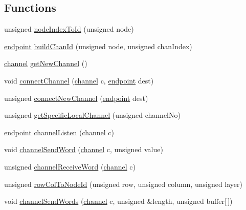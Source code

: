 \subsection*{Functions}
\begin{DoxyCompactItemize}
\item 
unsigned \hyperlink{_swallow-helpers_8h_a58f5683194e9d62e69b9d73ce1416055}{node\+Index\+To\+Id} (unsigned node)
\item 
\hyperlink{_swallow-helpers_8h_ab1358ba323e68c233f100abc11bdc7ea}{endpoint} \hyperlink{_swallow-helpers_8h_a096630d81be63da93af11a77c35163e8}{build\+Chan\+Id} (unsigned node, unsigned chan\+Index)
\item 
\hyperlink{_swallow-helpers_8h_aa6ea79b51cb1a11714e12ddd689dd15c}{channel} \hyperlink{_swallow-helpers_8h_ae766ff2b68dabf370997e2005ce2dc4d}{get\+New\+Channel} ()
\item 
void \hyperlink{_swallow-helpers_8h_a4fc6da8d25bce838539832b011089fb2}{connect\+Channel} (\hyperlink{_swallow-helpers_8h_aa6ea79b51cb1a11714e12ddd689dd15c}{channel} c, \hyperlink{_swallow-helpers_8h_ab1358ba323e68c233f100abc11bdc7ea}{endpoint} dest)
\item 
unsigned \hyperlink{_swallow-helpers_8h_aeea118ae867cb65d59545753ddabe89e}{connect\+New\+Channel} (\hyperlink{_swallow-helpers_8h_ab1358ba323e68c233f100abc11bdc7ea}{endpoint} dest)
\item 
unsigned \hyperlink{_swallow-helpers_8h_ad40c30ba1915e96e0addb8cc251e30c4}{get\+Specific\+Local\+Channel} (unsigned channel\+No)
\item 
\hyperlink{_swallow-helpers_8h_ab1358ba323e68c233f100abc11bdc7ea}{endpoint} \hyperlink{_swallow-helpers_8h_a9e2783667dec0a1a6a2c657b3b46e1a2}{channel\+Listen} (\hyperlink{_swallow-helpers_8h_aa6ea79b51cb1a11714e12ddd689dd15c}{channel} c)
\item 
void \hyperlink{_swallow-helpers_8h_a722c9a50b1ba184815f3ca8de58c331f}{channel\+Send\+Word} (\hyperlink{_swallow-helpers_8h_aa6ea79b51cb1a11714e12ddd689dd15c}{channel} c, unsigned value)
\item 
unsigned \hyperlink{_swallow-helpers_8h_a7af156772a17978b0db4f1f209da7bdd}{channel\+Receive\+Word} (\hyperlink{_swallow-helpers_8h_aa6ea79b51cb1a11714e12ddd689dd15c}{channel} c)
\item 
unsigned \hyperlink{_swallow-helpers_8h_aba1d74fda7711c040523169918cf186c}{row\+Col\+To\+Node\+Id} (unsigned row, unsigned column, unsigned layer)
\item 
void \hyperlink{_swallow-helpers_8h_ab09ce1b802b3c3c3a13b80db7139191d}{channel\+Send\+Words} (\hyperlink{_swallow-helpers_8h_aa6ea79b51cb1a11714e12ddd689dd15c}{channel} c, unsigned \&length, unsigned buffer\mbox{[}$\,$\mbox{]})

\end{DoxyCompactItemize}
